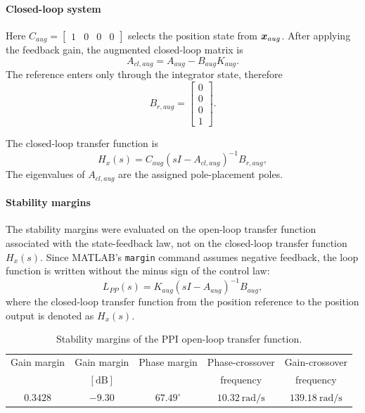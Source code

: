 \paragraph{Closed-loop system}
Here $C_{aug} = \begin{bmatrix}1 & 0 & 0 & 0\end{bmatrix}$ selects the position state from
$\boldsymbol{x}_{aug}$. After applying the feedback gain, the augmented closed-loop matrix is
\begin{equation}
    A_{cl,aug} = A_{aug} - B_{aug}K_{aug}.
\end{equation}
The reference enters only through the integrator state, therefore
\begin{equation}
    B_{r,aug} =
    \begin{bmatrix}
        0\\
        0\\
        0\\
        1
    \end{bmatrix}.
\end{equation}


The closed-loop transfer function is
\begin{equation}
    H_x(s) =
    C_{aug}\left(sI-A_{cl,aug}\right)^{-1}B_{r,aug},
\end{equation}
The eigenvalues of $A_{cl,aug}$ are the assigned pole-placement poles.

\paragraph{Stability margins}
The stability margins were evaluated on the open-loop transfer function associated with the
state-feedback law, not on the closed-loop transfer function $H_x(s)$. Since MATLAB's
\texttt{margin} command assumes negative feedback, the loop function is written without
the minus sign of the control law:
\begin{equation}
    L_{PP}(s) =
    K_{aug}\left(sI-A_{aug}\right)^{-1}B_{aug},
\end{equation}
where the closed-loop transfer function from the position reference to the position output is denoted
as $H_x(s)$.

\begin{table}[H]
\centering
\caption{Stability margins of the PPI open-loop transfer function.}
\label{tab:ppi_stability_margins}
\begin{tabular}{ccccc}
\toprule
Gain margin & Gain margin & Phase margin & Phase-crossover & Gain-crossover \\
 & $[\mathrm{dB}]$ &  & frequency & frequency \\
\midrule
$0.3428$ & $-9.30$ & $67.49^\circ$ & $10.32~\mathrm{rad/s}$ & $139.18~\mathrm{rad/s}$ \\
\bottomrule
\end{tabular}
\end{table}

